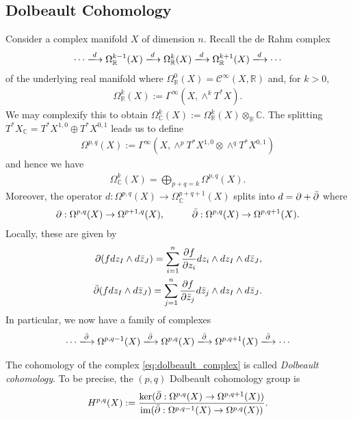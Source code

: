 \documentclass[12pt]{ociamthesis}  %
\begin{document}
\subsection{Dolbeault Cohomology}

Consider a complex manifold $X$ of dimension $n$. Recall the de Rahm
complex
\begin{align*}
  \cdots \xlongrightarrow{d}
  \Omega_{\mathbb{R}}^{k-1}(X)\xlongrightarrow{d}
  \Omega_{\mathbb{R}}^{k}(X)\xlongrightarrow{d}
  \Omega_{\mathbb{R}}^{k+1}(X)\xlongrightarrow{d}
  \cdots
\end{align*}
of the underlying real manifold where
$\Omega^0_{\mathbb{R}}(X) = \mathscr C^\infty(X,\mathbb{R})$ and,
for $k > 0$,
\begin{align*}
  \Omega^k_{\mathbb{R}}(X) := \Gamma^\infty(X,\wedge^k T^*X).
\end{align*}
We may complexify this to obtain
$\Omega^k_{\mathbb C}(X) := \Omega^k_{\mathbb R}(X)\otimes_{\mathbb{R}} \mathbb{C}$.
The splitting $T^*X_\mathbb{C} = T^*X^{1,0} \oplus T^*X^{0,1}$
leads us to define
\begin{align*}
  \Omega^{p,q}(X)
  := \Gamma^\infty(X,\wedge^p T^*X^{1,0} \otimes\wedge^q T^*X^{0,1})
\end{align*}
and hence we have
\begin{align*}
  \Omega^k_{\mathbb C}(X) = \bigoplus_{p+q=k} \Omega^{p,q}(X).
\end{align*}
Moreover, the operator $d : \Omega^{p,q}(X) \to \Omega^{p+q+1}_{\mathbb C}(X)$
splits into $d = \partial + {\bar{\partial}}$ where
\begin{align*}
  \partial : \Omega^{p,q}(X) \to \Omega^{p+1,q}(X),\hspace{1cm}
  {\bar{\partial}} : \Omega^{p,q}(X) \to \Omega^{p,q+1}(X).
\end{align*}
Locally, these are given by
\begin{align*}
  \partial (f dz_I \wedge d\bar z_J) = \sum_{i=1}^n \frac{\partial f}{\partial z_i} dz_i\wedge dz_I \wedge d\bar z_J, \\
  {\bar{\partial}} (f dz_I \wedge d\bar z_J) = \sum_{j=1}^n \frac{\partial f}{\partial \bar z_j} d\bar z_j\wedge dz_I \wedge d\bar z_J.
\end{align*}
In particular, we now have a family of complexes
\begin{align}\label{eq:dolbeault_complex}
  \cdots \xlongrightarrow\dol
  \Omega^{p,q-1}(X)\xlongrightarrow\dol
  \Omega^{p,q}(X)\xlongrightarrow\dol
  \Omega^{p,q+1}(X)\xlongrightarrow\dol
  \cdots
\end{align}
\begin{definition}
  The cohomology of the complex \ref{eq:dolbeault_complex} is
  called \emph{Dolbeault cohomology}. To be precise, the
  $(p,q)$ Dolbeault cohomology group is
  \begin{align*}
    H^{p,q}(X) := \frac{
      \ker({\bar{\partial}} : \Omega^{p,q}(X) \to \Omega^{p,q+1}(X))
    }{
      \operatorname{im}({\bar{\partial}} : \Omega^{p,q-1}(X) \to \Omega^{p,q}(X))
    }.
  \end{align*}
\end{definition}
\end{document}
